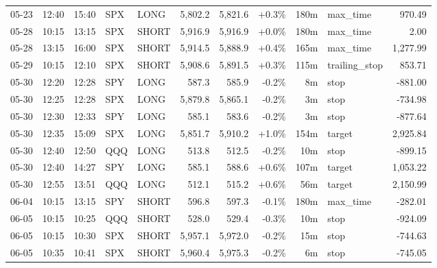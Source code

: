 \documentclass[11pt,a4paper,twoside]{article}
\begin{document}
\begin{center}
\begin{longtable}{>{\color{txtmain}}l l l l l r r r r >{\color{txtmain}}l r}
05-23 & 12:40 & 15:40 & SPX & LONG & 5,802.2 & 5,821.6 & \textcolor{wingreen}{+0.3\%} & 180m & max\_time & \textcolor{wingreen}{970.49} \\
05-28 & 10:15 & 13:15 & SPX & SHORT & 5,916.9 & 5,916.9 & \textcolor{wingreen}{+0.0\%} & 180m & max\_time & \textcolor{wingreen}{2.00} \\
05-28 & 13:15 & 16:00 & SPX & SHORT & 5,914.5 & 5,888.9 & \textcolor{wingreen}{+0.4\%} & 165m & max\_time & \textcolor{wingreen}{1,277.99} \\
05-29 & 10:15 & 12:10 & SPX & SHORT & 5,908.6 & 5,891.5 & \textcolor{wingreen}{+0.3\%} & 115m & trailing\_stop & \textcolor{wingreen}{853.71} \\
05-30 & 12:20 & 12:28 & SPY & LONG & 587.3 & 585.9 & \textcolor{lossred}{-0.2\%} & 8m & stop & \textcolor{lossred}{-881.00} \\
05-30 & 12:25 & 12:28 & SPX & LONG & 5,879.8 & 5,865.1 & \textcolor{lossred}{-0.2\%} & 3m & stop & \textcolor{lossred}{-734.98} \\
05-30 & 12:30 & 12:33 & SPY & LONG & 585.1 & 583.6 & \textcolor{lossred}{-0.2\%} & 3m & stop & \textcolor{lossred}{-877.64} \\
05-30 & 12:35 & 15:09 & SPX & LONG & 5,851.7 & 5,910.2 & \textcolor{wingreen}{+1.0\%} & 154m & target & \textcolor{wingreen}{2,925.84} \\
05-30 & 12:40 & 12:50 & QQQ & LONG & 513.8 & 512.5 & \textcolor{lossred}{-0.2\%} & 10m & stop & \textcolor{lossred}{-899.15} \\
05-30 & 12:40 & 14:27 & SPY & LONG & 585.1 & 588.6 & \textcolor{wingreen}{+0.6\%} & 107m & target & \textcolor{wingreen}{1,053.22} \\
05-30 & 12:55 & 13:51 & QQQ & LONG & 512.1 & 515.2 & \textcolor{wingreen}{+0.6\%} & 56m & target & \textcolor{wingreen}{2,150.99} \\
06-04 & 10:15 & 13:15 & SPY & SHORT & 596.8 & 597.3 & \textcolor{lossred}{-0.1\%} & 180m & max\_time & \textcolor{lossred}{-282.01} \\
06-05 & 10:15 & 10:25 & QQQ & SHORT & 528.0 & 529.4 & \textcolor{lossred}{-0.3\%} & 10m & stop & \textcolor{lossred}{-924.09} \\
06-05 & 10:15 & 10:30 & SPX & SHORT & 5,957.1 & 5,972.0 & \textcolor{lossred}{-0.2\%} & 15m & stop & \textcolor{lossred}{-744.63} \\
06-05 & 10:35 & 10:41 & SPX & SHORT & 5,960.4 & 5,975.3 & \textcolor{lossred}{-0.2\%} & 6m & stop & \textcolor{lossred}{-745.05} \\

\end{longtable}
\end{center}
\end{document}
